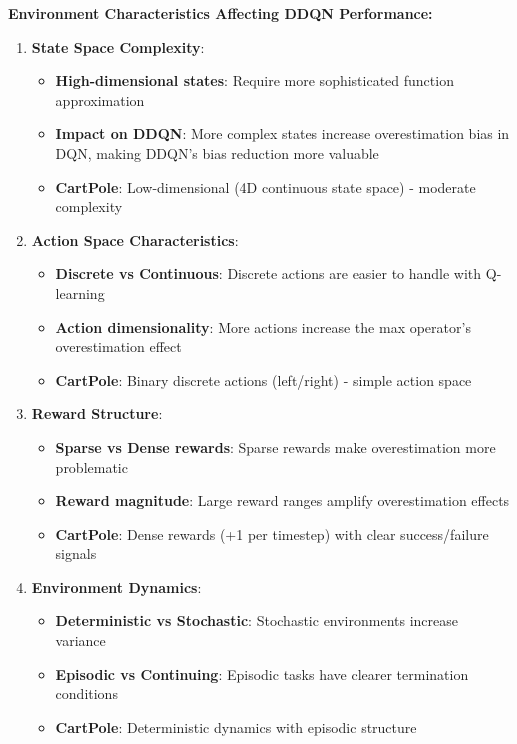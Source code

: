 \documentclass[12pt]{article}
\begin{document}
{{{\textbf{Environment Characteristics Affecting DDQN Performance:}

\begin{enumerate}
    \item \textbf{State Space Complexity}:
    \begin{itemize}
        \item \textbf{High-dimensional states}: Require more sophisticated function approximation
        \item \textbf{Impact on DDQN}: More complex states increase overestimation bias in DQN, making DDQN's bias reduction more valuable
        \item \textbf{CartPole}: Low-dimensional (4D continuous state space) - moderate complexity
    \end{itemize}
    
    \item \textbf{Action Space Characteristics}:
    \begin{itemize}
        \item \textbf{Discrete vs Continuous}: Discrete actions are easier to handle with Q-learning
        \item \textbf{Action dimensionality}: More actions increase the max operator's overestimation effect
        \item \textbf{CartPole}: Binary discrete actions (left/right) - simple action space
    \end{itemize}
    
    \item \textbf{Reward Structure}:
    \begin{itemize}
        \item \textbf{Sparse vs Dense rewards}: Sparse rewards make overestimation more problematic
        \item \textbf{Reward magnitude}: Large reward ranges amplify overestimation effects
        \item \textbf{CartPole}: Dense rewards (+1 per timestep) with clear success/failure signals
    \end{itemize}
    
    \item \textbf{Environment Dynamics}:
    \begin{itemize}
        \item \textbf{Deterministic vs Stochastic}: Stochastic environments increase variance
        \item \textbf{Episodic vs Continuing}: Episodic tasks have clearer termination conditions
        \item \textbf{CartPole}: Deterministic dynamics with episodic structure
    \end{itemize}
    

\end{enumerate}}}}
\end{document}
